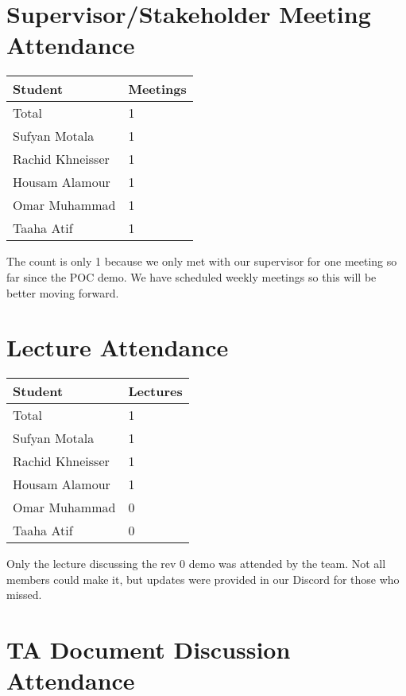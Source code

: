\documentclass{article}
\begin{document}

\section{Supervisor/Stakeholder Meeting Attendance}

\begin{table}[H]
\centering
\begin{tabular}{ll}
\toprule
\textbf{Student} & \textbf{Meetings}\\
\midrule
Total & 1\\
Sufyan Motala & 1\\
Rachid Khneisser & 1\\
Housam Alamour & 1\\
Omar Muhammad & 1\\
Taaha Atif & 1\\
\bottomrule
\end{tabular}
\end{table}

The count is only 1 because we only met with our supervisor for one meeting so far since the POC demo. We have scheduled weekly meetings so this will be better moving forward.

\section{Lecture Attendance}

\begin{table}[H]
\centering
\begin{tabular}{ll}
\toprule
\textbf{Student} & \textbf{Lectures}\\
\midrule
Total & 1\\
Sufyan Motala & 1\\
Rachid Khneisser & 1\\
Housam Alamour & 1\\
Omar Muhammad & 0\\
Taaha Atif & 0\\
\bottomrule
\end{tabular}
\end{table}

Only the lecture discussing the rev 0 demo was attended by the team. Not all members could make it, but updates were provided in our Discord for those who missed.

\section{TA Document Discussion Attendance}
\end{document}
